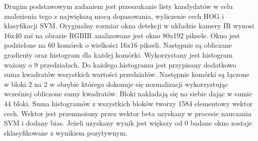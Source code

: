 Drugim podstawowym zadaniem jest przeszukanie listy kandydatów w celu znalezienia tego z największą mocą dopasowania, wyliczenie cech HOG i klasyfikacji SVM. Oryginalny rozmiar okna detekcji w układzie kamery IR wynosi 16x40 zaś na obrazie RGBIR analizowane jest okno 80x192 piksele. Okno jest podzielone na 60 komórek o wielkości 16x16 pikseli. Następnie są obliczane gradienty oraz histogram dla każdej komórki. Wykorzystany jest histogram ważony o 9 przedziałach. Do każdego histogramu jest przypisany dodatkowo suma kwadratów wszystkich wartości przedziałów. Następnie komórki są łączone w bloki 2 na 2 w obrębie którego dokonuje się normalizacji wykorzystując wcześniej obliczone sumy kwadratów. Bloki nakładają się na siebie dając w sumie 44 bloki. Suma histogramów z wszystkich bloków tworzy 1584 elementowy wektor cech. Wektor jest przemnożony przez wektor beta uzyskany w procesie nauczania SVM i dodany bias. Jeżeli uzyskany wynik jest większy od 0 badane okno zostaje sklasyfikowane z wynikiem pozytywnym.

